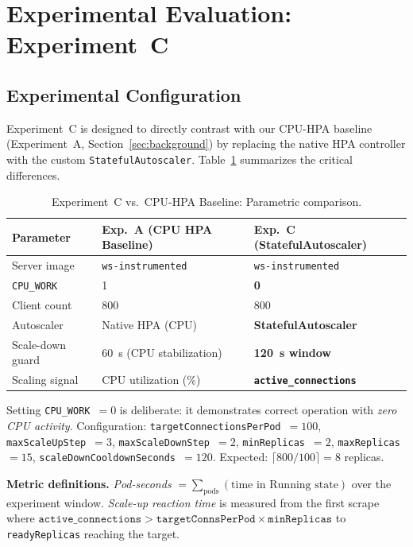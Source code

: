 \documentclass[3p,twocolumn]{elsarticle}
\theoremstyle{plain}%
\theoremstyle{definition}%
\begin{document}
\section{Experimental Evaluation: Experiment~C}
\label{sec:evaluation}

\subsection{Experimental Configuration}

Experiment~C is designed to directly contrast with our CPU-HPA baseline (Experiment~A, Section~\ref{sec:background}) by replacing the native HPA controller with the
custom \texttt{StatefulAutoscaler}. Table~\ref{tab:exp_c_setup} summarizes the critical
differences.

\begin{table}[!tp]
\centering
\caption{Experiment~C vs.\ CPU-HPA Baseline: Parametric comparison.}
\label{tab:exp_c_setup}
\small
\begin{tabular}{@{}lll@{}}
\toprule
\rowcolor{gray!12}
\textbf{Parameter} & \textbf{Exp.~A (CPU HPA Baseline)} & \textbf{Exp.~C (StatefulAutoscaler)} \\
\midrule
Server image & \texttt{ws-instrumented} & \texttt{ws-instrumented} \\
\texttt{CPU\_WORK} & 1 & \textbf{0} \\
Client count & 800 & 800 \\
Autoscaler & Native HPA (CPU) & \textbf{StatefulAutoscaler} \\
Scale-down guard & 60~s (CPU stabilization) & \textbf{120~s window} \\
Scaling signal & CPU utilization (\%) & \textbf{\texttt{active\_connections}} \\
\bottomrule
\end{tabular}
\end{table}

Setting \texttt{CPU\_WORK}~$= 0$ is deliberate: it demonstrates correct operation with \textit{zero CPU activity}. Configuration: \texttt{targetConnectionsPerPod}~$= 100$, \texttt{maxScaleUpStep}~$= 3$, \texttt{maxScaleDownStep}~$= 2$, \texttt{minReplicas}~$= 2$, \texttt{maxReplicas}~$= 15$, \texttt{scaleDownCooldownSeconds}~$= 120$. Expected: $\lceil 800/100 \rceil = 8$ replicas.

\textbf{Metric definitions.} \textit{Pod-seconds} $= \sum_{\text{pods}} (\text{time in Running state})$ over the experiment window. \textit{Scale-up reaction time} is measured from the first scrape where $\texttt{active\_connections} > \texttt{targetConnsPerPod} \times \texttt{minReplicas}$ to \texttt{readyReplicas} reaching the target.
\end{document}
